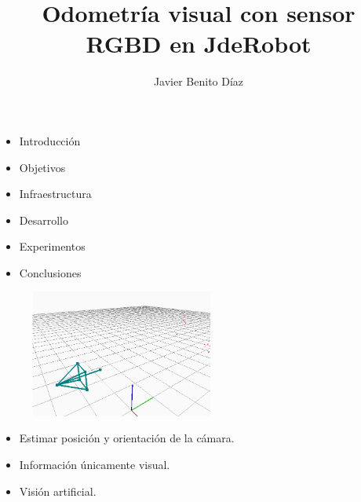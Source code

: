 \documentclass[notes,slidesec,a4]{seminar}
\title{Odometría visual con sensor RGBD en JdeRobot}
\author{Javier Benito Díaz}
\begin{document}
\maketitle


\begin{hslide}
	\begin{itemize}
		\item Introducción 
		\item Objetivos
		\item Infraestructura
		\item Desarrollo
		\item Experimentos
		\item Conclusiones
	\end{itemize}
\end{hslide}


\begin{hslide}
	\begin{minipage}{6cm}
		\begin{center}
			\begin{figure}
				\includegraphics[width=6.0cm]{img/camera-opengl.png}
			\end{figure}
		\end{center}
	\end{minipage} \hfill
	\begin{minipage}{5cm}
		\begin{itemize}
			\item Estimar posición y orientación de la cámara.
			\item Información únicamente visual.
			\item Visión artificial.
		\end{itemize}
	\end{minipage}
\end{hslide}

\end{document}

